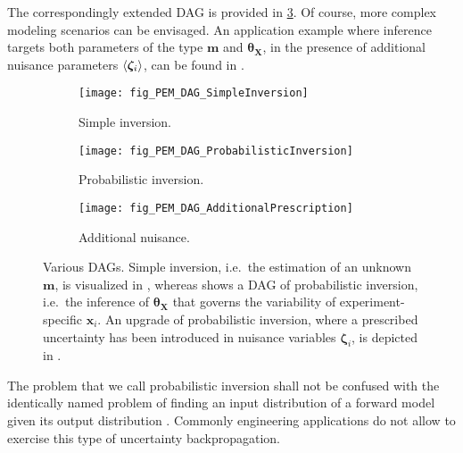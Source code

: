 The correspondingly extended DAG is provided in \cref{fig:PEM:DAG:AddPres}.
Of course, more complex modeling scenarios can be envisaged.
An application example where inference targets both parameters of the type \(\bm{m}\) and \(\bm{\theta}_{\bm{X}}\),
in the presence of additional nuisance parameters \(\langle{\bm{\zeta}_i}\rangle\), can be found in \cite{Nagel:SciTech2014:Proc,Nagel:JAIS2015}.
\begin{figure}[ht]
  \centering
  \begin{subfigure}[b]{0.33\textwidth}
    \centering
    \texttt{[image: fig\_PEM\_DAG\_SimpleInversion]}
    \caption{Simple inversion.}
    \label{fig:PEM:DAG:SimpleInv}
  \end{subfigure}%
  \begin{subfigure}[b]{0.33\textwidth}
    \centering
    \texttt{[image: fig\_PEM\_DAG\_ProbabilisticInversion]}
    \caption{Probabilistic inversion.}
    \label{fig:PEM:DAG:ProbInv}
  \end{subfigure}%
  \begin{subfigure}[b]{0.33\textwidth}
    \centering
    \texttt{[image: fig\_PEM\_DAG\_AdditionalPrescription]}
    \caption{Additional nuisance.}
    \label{fig:PEM:DAG:AddPres}
  \end{subfigure}%
  \caption[Various DAGs]{Various DAGs.
           Simple inversion, i.e.\ the estimation of an unknown \(\bm{m}\), is visualized in ,
           whereas  shows a DAG of probabilistic inversion, i.e.\ the inference of \(\bm{\theta}_{\bm{X}}\) that governs the variability  of experiment-specific \(\bm{x}_i\).
           An upgrade of probabilistic inversion, where a prescribed uncertainty has been introduced in nuisance variables \(\bm{\zeta}_i\), is depicted in .
           }
  \label{fig:PEM:DAG:Additional}
\end{figure}
\par %
The problem that we call probabilistic inversion shall not be confused with the identically named problem
of finding an input distribution of a forward model given its output distribution \cite{Inversion:Kraan2005,Inversion:Du2006}.
Commonly engineering applications do not allow to exercise this type of uncertainty backpropagation.
